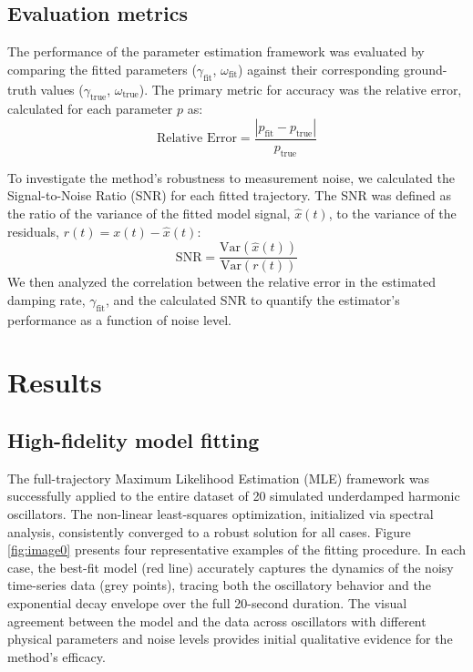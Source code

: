 \documentclass[]{article}
\begin{document}
\subsection{Evaluation metrics}
The performance of the parameter estimation framework was evaluated by comparing the fitted parameters ($\gamma_{\text{fit}}$, $\omega_{\text{fit}}$) against their corresponding ground-truth values ($\gamma_{\text{true}}$, $\omega_{\text{true}}$). The primary metric for accuracy was the relative error, calculated for each parameter $p$ as:
\begin{equation}
\text{Relative Error} = \frac{|p_{\text{fit}} - p_{\text{true}}|}{p_{\text{true}}}
\end{equation}

To investigate the method's robustness to measurement noise, we calculated the Signal-to-Noise Ratio (SNR) for each fitted trajectory. The SNR was defined as the ratio of the variance of the fitted model signal, $\hat{x}(t)$, to the variance of the residuals, $r(t) = x(t) - \hat{x}(t)$:
\begin{equation}
\text{SNR} = \frac{\text{Var}(\hat{x}(t))}{\text{Var}(r(t))}
\end{equation}
We then analyzed the correlation between the relative error in the estimated damping rate, $\gamma_{\text{fit}}$, and the calculated SNR to quantify the estimator's performance as a function of noise level.

\section{Results}
\label{sec:results}
\subsection{High-fidelity model fitting}

The full-trajectory Maximum Likelihood Estimation (MLE) framework was successfully applied to the entire dataset of 20 simulated underdamped harmonic oscillators. The non-linear least-squares optimization, initialized via spectral analysis, consistently converged to a robust solution for all cases. Figure \ref{fig:image0} presents four representative examples of the fitting procedure. In each case, the best-fit model (red line) accurately captures the dynamics of the noisy time-series data (grey points), tracing both the oscillatory behavior and the exponential decay envelope over the full 20-second duration. The visual agreement between the model and the data across oscillators with different physical parameters and noise levels provides initial qualitative evidence for the method's efficacy.
\end{document}
